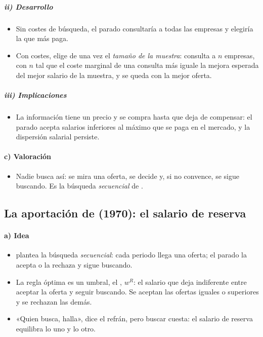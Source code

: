 \documentclass[11pt]{article}
\begin{document}
\subparagraph{ii) Desarrollo}

\begin{itemize}
\item Sin costes de búsqueda, el parado consultaría a todas las empresas y elegiría la que más paga.
\item Con costes, elige de una vez el \emph{tamaño de la muestra}: consulta a $n$ empresas, con $n$ tal que el coste marginal de una consulta más iguale la mejora esperada del mejor salario de la muestra, y se queda con la mejor oferta.
\end{itemize}

\subparagraph{iii) Implicaciones}

\begin{itemize}
\item La información tiene un precio y se compra hasta que deja de compensar: el parado acepta salarios inferiores al máximo que se paga en el mercado, y la dispersión salarial persiste.
\end{itemize}

\paragraph{c) Valoración}

\begin{itemize}
\item Nadie busca así: se mira una oferta, se decide y, si no convence, se sigue buscando. Es la búsqueda \emph{secuencial} de .
\end{itemize}

\subsection{La aportación de  (1970): el salario de reserva}\label{sec:mccall}

\paragraph{a) Idea}

\begin{itemize}
\item \textcite{McCall1970Economics} plantea la búsqueda \emph{secuencial}: cada periodo llega una oferta; el parado la acepta o la rechaza y sigue buscando.
\item La regla óptima es un umbral, el , $w^R$: el salario que deja indiferente entre aceptar la oferta y seguir buscando. Se aceptan las ofertas iguales o superiores y se rechazan las demás.
\item «Quien busca, halla», dice el refrán, pero buscar cuesta: el salario de reserva equilibra lo uno y lo otro.
\end{itemize}
\end{document}
